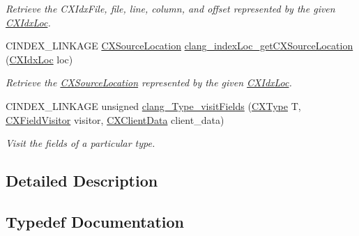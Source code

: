 \begin{DoxyCompactItemize}
\begin{DoxyCompactList}\small\item\em Retrieve the C\+X\+Idx\+File, file, line, column, and offset represented by the given \hyperlink{structCXIdxLoc}{C\+X\+Idx\+Loc}. \end{DoxyCompactList}\item 
\mbox{\label{group__CINDEX__HIGH_ga89d0ff9816ec25f6d68edc5cbc908c20}} 
C\+I\+N\+D\+E\+X\+\_\+\+L\+I\+N\+K\+A\+GE \hyperlink{structCXSourceLocation}{C\+X\+Source\+Location} \hyperlink{group__CINDEX__HIGH_ga89d0ff9816ec25f6d68edc5cbc908c20}{clang\+\_\+index\+Loc\+\_\+get\+C\+X\+Source\+Location} (\hyperlink{structCXIdxLoc}{C\+X\+Idx\+Loc} loc)
\begin{DoxyCompactList}\small\item\em Retrieve the \hyperlink{structCXSourceLocation}{C\+X\+Source\+Location} represented by the given \hyperlink{structCXIdxLoc}{C\+X\+Idx\+Loc}. \end{DoxyCompactList}\item 
C\+I\+N\+D\+E\+X\+\_\+\+L\+I\+N\+K\+A\+GE unsigned \hyperlink{group__CINDEX__HIGH_ga18285a2cefecf5a069c64e675b627273}{clang\+\_\+\+Type\+\_\+visit\+Fields} (\hyperlink{structCXType}{C\+X\+Type} T, \hyperlink{group__CINDEX__HIGH_ga5040863c91d7a720a97569cf869f42a4}{C\+X\+Field\+Visitor} visitor, \hyperlink{group__CINDEX_gacfa40c3de26d228c0d898403c2c21612}{C\+X\+Client\+Data} client\+\_\+data)
\begin{DoxyCompactList}\small\item\em Visit the fields of a particular type. \end{DoxyCompactList}\end{DoxyCompactItemize}


\subsection{Detailed Description}


\subsection{Typedef Documentation}
\mbox{\label{group__CINDEX__HIGH_ga5040863c91d7a720a97569cf869f42a4}} 
